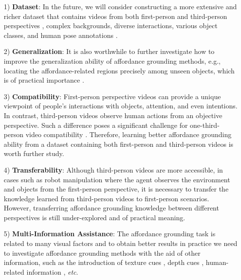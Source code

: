\documentclass[journal,twoside]{IEEEtran}
\def\etc{\emph{etc}}
\begin{document}
\begin{itemize}
    \item [1)]
    \textbf{Dataset}: In the future, we will consider constructing a more extensive and richer dataset that contains videos from both first-person and third-person perspectives \cite{sigurdsson2018charades}, complex backgrounds, diverse interactions,  various object classes, and human pose annotations \cite{zhang2020towards}.
    
    \item [2)]
    \textbf{Generalization}: It is also worthwhile to further investigate how to improve the generalization ability \cite{zhu2019one,zhu2020one,zhu2020self,zhu2021self,wang2020deep} of affordance grounding methods, e.g., locating the affordance-related regions precisely among unseen objects, which is of practical importance \cite{Luo2021one}.
    
    \item [3)]
    \textbf{Compatibility}: First-person perspective videos can provide a unique viewpoint of people's interactions with objects, attention, and even intentions. In contrast, third-person videos observe human actions from an objective perspective. Such a difference poses a significant challenge for one-third-person video compatibility \cite{yu2020first,sigurdsson2018actor}. Therefore, learning better affordance grounding ability from a dataset containing both first-person and third-person videos is worth further study.
    
    \item [4)]
    \textbf{Transferability}: Although third-person videos are more accessible, in cases such as robot manipulation where the agent observes the environment and objects from the first-person perspective, it is necessary to transfer the knowledge learned from third-person videos to first-person scenarios. However, transferring affordance grounding knowledge between different perspectives \cite{li2021ego} is still under-explored and of practical meaning.
    
    \item [5)]
    \textbf{Multi-Information Assistance}: The affordance grounding task is related to many visual factors and to obtain better results in practice we need to investigate affordance grounding methods with the aid of other information, such as the introduction of texture cues \cite{zhai2019deep,zhai2020deep}, depth cues \cite{zhao2020monocular}, human-related information \cite{zhang2020towards,he2020grapy}, \etc.
    
\end{itemize}



\end{document}

